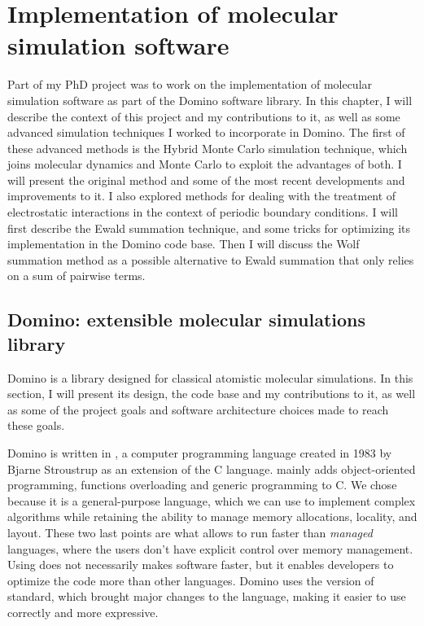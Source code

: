 \documentclass[thesis]{subfiles}
\begin{document}
\OnlyInSubfile{\setcounter{chapter}{5}}

\chapter{Implementation of molecular simulation software}

Part of my PhD project was to work on the implementation of molecular simulation
software as part of the Domino software library. In this chapter, I will describe
the context of this project and my contributions to it, as well as some advanced
simulation techniques I worked to incorporate in Domino. The first of these
advanced methods is the Hybrid Monte Carlo simulation technique, which joins
molecular dynamics and Monte Carlo to exploit the advantages of both. I will
present the original method and some of the most recent developments and
improvements to it. I also explored methods for dealing with the treatment of
electrostatic interactions in the context of periodic boundary conditions. I
will first describe the Ewald summation technique, and some tricks for
optimizing its implementation in the Domino code base. Then I will discuss the
Wolf summation method as a possible alternative to Ewald summation that only
relies on a sum of pairwise terms.

\newpage
\section{Domino: extensible molecular simulations library}

Domino is a \cxx library designed for classical atomistic molecular simulations.
In this section, I will present its design, the code base and my contributions
to it, as well as some of the project goals and software architecture choices
made to reach these goals.

Domino is written in \cxx, a computer programming language created in 1983 by
Bjarne Stroustrup as an extension of the C language. \cxx mainly adds
object-oriented programming, functions overloading and generic programming to C.
We chose \cxx because it is a general-purpose language, which we can use to
implement complex algorithms while retaining the ability to manage memory
allocations, locality, and layout. These two last points are what allows \cxx to
run faster than \emph{managed} languages, where the users don't have explicit
control over memory management. Using \cxx does not necessarily makes software
faster, but it enables developers to optimize the code more than other
languages. Domino uses the  version of \cxx standard, which brought major
changes to the language, making it easier to use correctly and more expressive.
\end{document}
